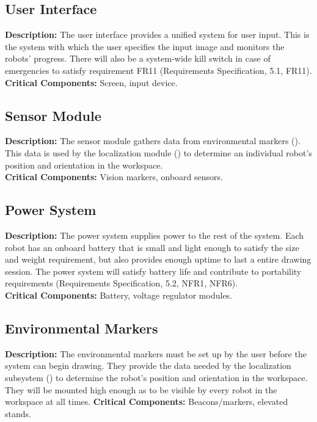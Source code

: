 \subsection{User Interface}
\label{sec:subsystem_ui}
\textbf{Description:} The user interface provides a unified system for user input. This is the system with which the user specifies the input image and monitors the robots' progress. There will also be a system-wide kill switch in case of emergencies to satisfy requirement FR11 (Requirements Specification, 5.1, FR11).\\
\textbf{Critical Components:} Screen, input device.\\

\subsection{Sensor Module}
\label{sec:subsystem_sensors}
\textbf{Description:} The sensor module gathers data from environmental markers (). This data is used by the localization module () to determine an individual robot's position and orientation in the workspace.\\
\textbf{Critical Components:} Vision markers, onboard sensors.\\

\subsection{Power System}
\label{sec:subsystem_power}
\textbf{Description:} The power system supplies power to the rest of the system. Each robot has an onboard battery that is small and light enough to satisfy the size and weight requirement, but also provides enough uptime to last a entire drawing session. The power system will satisfy battery life and contribute to portability requirements (Requirements Specification, 5.2, NFR1, NFR6).\\
\textbf{Critical Components:} Battery, voltage regulator modules.\\

\subsection{Environmental Markers}
\label{sec:subsystem_markers}
\textbf{Description:} The environmental markers must be set up by the user before the system can begin drawing. They provide the data needed by the localization subsystem () to determine the robot's position and orientation in the workspace. They will be mounted high enough as to be visible by every robot in the workspace at all times.
\textbf{Critical Components:} Beacons/markers, elevated stands.